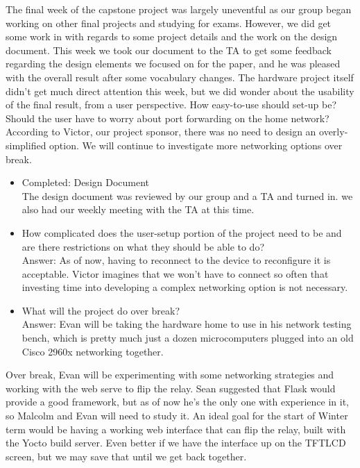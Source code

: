 \documentclass[letterpaper,10pt]{article}
\begin{document}
The final week of the capstone project was largely uneventful as our group
began working on other final projects and studying for exams. However, we did
get some work in with regards to some project details and the work on the
design document.  This week we took our document to the TA to get some feedback
regarding the design elements we focused on for the paper, and he was pleased
with the overall result after some vocabulary changes.  The hardware project
itself didn't get much direct attention this week, but we did wonder about the
usability of the final result, from a user perspective.  How easy-to-use should
set-up be? Should the user have to worry about port forwarding on the home
network?  According to Victor, our project sponsor, there was no need to design
an overly-simplified option.  We will continue to investigate more networking
options over break.

\begin{itemize}
    \item Completed: Design Document\\
        The design document was reviewed by our group and a TA and turned in.
        we also had our weekly meeting with the TA at this time.  
    \item How complicated does the user-setup portion of the project need to be
        and are there restrictions on what they should be able to do?\\
        Answer: As of now, having to reconnect to the device to reconfigure it
        is acceptable. Victor imagines that we won't have to connect so often
        that investing time into developing a complex networking option is not
        necessary.
    \item What will the project do over break?\\
        Answer: Evan will be taking the hardware home to use in his network
        testing bench, which is pretty much just a dozen microcomputers plugged
        into an old Cisco 2960x networking together. 
\end{itemize}

Over break, Evan will be experimenting with some networking strategies and
working with the web serve to flip the relay. Sean suggested that Flask would
provide a good framework, but as of now he's the only one with experience in
it, so Malcolm and Evan will need to study it. An ideal goal for the start of
Winter term would be having a working web interface that can flip the relay,
built with the Yocto build server. Even better if we have the interface up on
the TFTLCD screen, but we may save that until we get back together.
\end{document}
